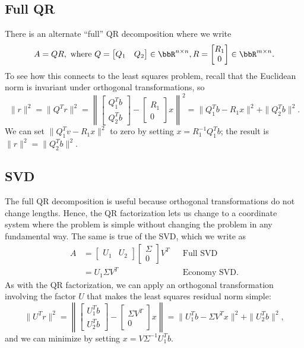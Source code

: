\documentclass[12pt, leqno]{article} %
\begin{document}
\subsection{Full QR}

There is an alternate ``full'' QR decomposition where we write
\[
A = QR, \mbox{ where }
Q = \begin{bmatrix} Q_1 & Q_2 \end{bmatrix} \in \bbR^{n \times n},
R = \begin{bmatrix} R_{1} \\ 0 \end{bmatrix} \in \bbR^{m \times n}.
\]
To see how this connects to the least squares problem, recall
that the Euclidean norm is invariant under orthogonal transformations,
so
\[
  \|r\|^2 = \|Q^T r\|^2 = \left\| \begin{bmatrix} Q_1^T b \\ Q_2^T
    b \end{bmatrix} - \begin{bmatrix} R_1 \\ 0 \end{bmatrix} x
  \right\|^2 = \|Q_1^T b-R_1x\|^2 + \|Q_2^T b\|^2.
\]
We can set $\|Q_1^T v-R_1 x\|^2$ to zero by
setting $x = R_1^{-1} Q_1^T b$; the result is
$\|r\|^2 = \|Q_2^T b\|^2$.

\subsection{SVD}

The full QR decomposition is useful because orthogonal transformations
do not change lengths.  Hence, the QR factorization lets us change
to a coordinate system where the problem is simple without changing
the problem in any fundamental way.  The same is true of the SVD,
which we write as
\begin{align*}
A &=
\begin{bmatrix} U_1 & U_2 \end{bmatrix}
\begin{bmatrix} \Sigma \\ 0 \end{bmatrix}
V^T & & \mbox{Full SVD} \\
&= U_1 \Sigma V^T & & \mbox{Economy SVD}.
\end{align*}
As with the QR factorization, we can apply an orthogonal
transformation involving the factor $U$ that makes the
least squares residual norm simple:
\[
\|U^T r\|^2 =
\left\| \begin{bmatrix} U_1^T b \\ U_2^T b \end{bmatrix} -
\begin{bmatrix} \Sigma V^T \\ 0 \end{bmatrix} x
\right\| =
\|U_1^T b - \Sigma V^T x\|^2 + \|U_2^T b\|^2,
\]
and we can minimize by setting $x = V \Sigma^{-1} U_1^T b$.
\end{document}
